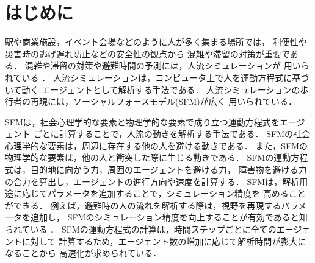 \newcommand{\tensaku}[1]{}

\chapter{はじめに}
\label{sec:intro}
\tensaku{\section{人流シミュレーションの背景と需要}}
駅や商業施設，イベント会場などのように人が多く集まる場所では，
利便性や災害時の逃げ遅れ防止などの安全性の観点から
混雑や滞留の対策が重要である\cite{taisaku1}\cite{taisaku2}．
混雑や滞留の対策や避難時間の予測には，人流シミュレーションが
用いられている
\cite{sim_jirei1}\cite{sim_jirei2}\cite{sim_jirei3}\cite{sim_jirei8}\cite{sim_jirei7}．
人流シミュレーションは，コンピュータ上で人を運動方程式に基づいて動く
エージェントとして解析する手法である．
人流シミュレーションの歩行者の再現には，ソーシャルフォースモデル(SFM)が広く
用いられている\cite{sim_walk}\cite{sfm_jirei1}\cite{sfm_jirei2}．

\tensaku{\section{Social Force Model}}
SFMは，社会心理学的な要素と物理学的な要素で成り立つ運動方程式をエージェント
ごとに計算することで，人流の動きを解析する手法である\cite{helbing_sfm}．
SFMの社会心理学的な要素は，周辺に存在する他の人を避ける動きである．
また，SFMの物理学的な要素は，他の人と衝突した際に生じる動きである．
SFMの運動方程式は，目的地に向かう力，周囲のエージェントを避ける力，
障害物を避ける力の合力を算出し，エージェントの進行方向や速度を計算する．
SFMは，解析用途に応じてパラメータを追加することで，シミュレーション精度を
高めることができる．
例えば，避難時の人の流れを解析する際は，視野を再現するパラメータを追加し，
SFMのシミュレーション精度を向上することが有効であると知られている
\cite{siya_ex2}\cite{siya_ex3}\cite{siya_ex4}
\cite{siya_ex5}\cite{siya_ex6}\cite{siya_ex7}．
SFMの運動方程式の計算は，時間ステップごとに全てのエージェントに対して
計算するため，エージェント数の増加に応じて解析時間が膨大になることから
高速化が求められている．


